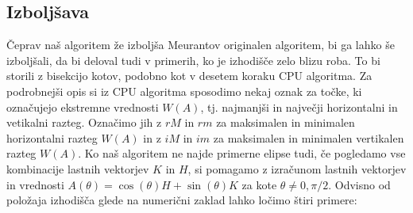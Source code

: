 \documentclass[12pt,a4paper]{amsart}
\theoremstyle{definition}
\theoremstyle{plain}
\begin{document}
\subsection{Izboljšava}
Čeprav naš algoritem že izboljša Meurantov originalen algoritem, bi ga lahko še izboljšali, da bi deloval tudi v primerih, ko je izhodišče zelo blizu roba.
To bi storili z bisekcijo kotov, podobno kot v desetem koraku CPU algoritma.
Za podrobnejši opis si iz CPU algoritma sposodimo nekaj oznak za točke, ki označujejo ekstremne vrednosti $W(A)$, tj. najmanjši in največji horizontalni in vetikalni razteg. 
Označimo jih z $rM$ in $rm$ za maksimalen in minimalen horizontalni razteg $W(A)$ in z $iM$ in $im$ za maksimalen in minimalen vertikalen razteg $W(A)$.
Ko naš algoritem ne najde primerne elipse tudi, če pogledamo vse kombinacije lastnih vektorjev $K$ in $H$, si pomagamo z izračunom lastnih vektorjev in vrednosti $A(\theta)=\cos(\theta)H+\sin(\theta)K$ za kote $\theta \not =0,\pi/2$.
Odvisno od položaja izhodišča glede na numerični zaklad lahko ločimo štiri primere:
\end{document}
